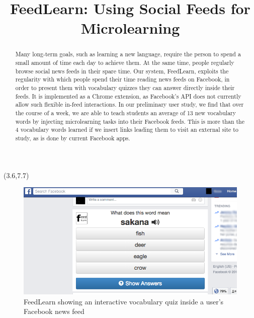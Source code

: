 \documentclass{chi-ext}
\title{FeedLearn: Using Social Feeds for Microlearning}
\author{
  \alignauthor{
  	\textbf{Geza Kovacs}\\
  	\affaddr{Department of Computer Science, Stanford University}\\
  	\email{geza@cs.stanford.edu}
  }
}
\begin{document}
\maketitle

\begin{textblock}{5}(3.6,7.7)
\begin{figure}
\includegraphics[width=\columnwidth]{feedlearn-screenshot.png}
\caption{FeedLearn showing an interactive vocabulary quiz inside a user's Facebook news feed}
\label{fig:feedlearn}
\end{figure}
\end{textblock}

\begin{abstract}
Many long-term goals, such as learning a new language,
require the person to spend a small amount of time each day to achieve them.
At the same time, people regularly browse social news feeds in their spare time.
Our system, FeedLearn, exploits the regularity with which people spend their time reading news feeds on Facebook,
in order to present them with vocabulary quizzes they can answer directly inside their feeds.
It is implemented as a Chrome extension, as Facebook's API does not currently allow such flexible
in-feed interactions.
In our preliminary user study, we find that over the course of a week, we are able to teach students an average of 13 new vocabulary words by injecting microlearning tasks into their Facebook feeds. This is more than the 4 vocabulary words learned if we insert links leading them to visit an external site to study, as is done by current Facebook apps.
\end{abstract}
\end{document}

